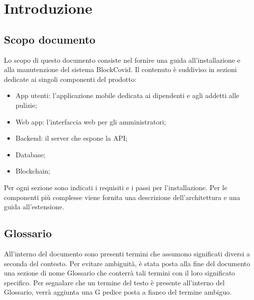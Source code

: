 \section{Introduzione}

\subsection{Scopo documento}
Lo scopo di questo documento consiste nel fornire una guida all'installazione e alla manutenzione del sistema BlockCovid. Il contenuto è suddiviso in sezioni dedicate ai singoli componenti del prodotto:
\begin{itemize}
	\item App utenti: l'applicazione mobile dedicata ai dipendenti e agli addetti alle pulizie;
	\item Web app: l'interfaccia web per gli amministratori;
	\item Backend: il server che espone la API;
	\item Database;
	\item Blockchain;
\end{itemize}
Per ogni sezione sono indicati i requisiti e i passi per l'installazione. Per le componenti più complesse viene fornita una descrizione dell'architettura e una guida all'estensione.

\subsection{Glossario}
All’interno del documento sono presenti termini che assumono significati diversi a seconda del contesto. Per evitare ambiguità, è stata posta alla fine del documento una sezione di nome Glossario che conterrà tali termini con il loro significato specifico. Per segnalare che un termine del testo è presente all’interno del Glossario, verrà aggiunta una G pedice posta a fianco del termine ambiguo.
